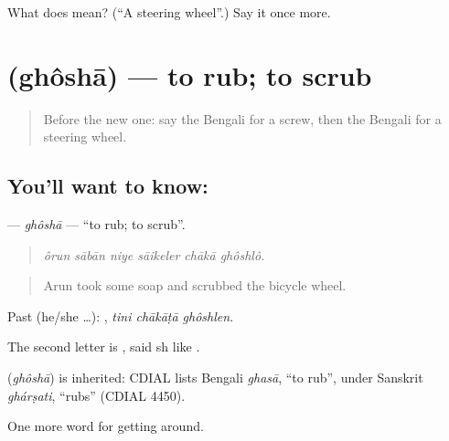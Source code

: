\begin{tcolorbox}[breakable,colback=teal!4,colframe=teal!35!black,title={Before you move on}]
What does  mean? (\textquotedblleft{}A steering wheel\textquotedblright{}.) Say it once more.
\end{tcolorbox}
\section[\texorpdfstring{\bn{ঘষা} (ghôshā)}{ঘষা (ghôshā)}]{ (ghôshā) — to rub; to scrub}

\label{lesson:BN-C394-ghosha}



\begin{quote}
Before the new one: say the Bengali for a screw, then the Bengali for a steering wheel.
\end{quote}

\subsection*{You'll want to know: }
\textbf{} — \emph{ghôshā} — \textquotedblleft{}to rub; to scrub\textquotedblright{}.

\begin{quote}
     
\end{quote}

\begin{quote}
\emph{ôrun sābān niye sāikeler chākā ghôshlô.}
\end{quote}

\begin{quote}
Arun took some soap and scrubbed the bicycle wheel.
\end{quote}

Past (he/she …):   , \emph{tini chākāṭā ghôshlen}.

The second letter is , said sh like .

\begin{cousinweb}
\textbf{} (\emph{ghôshā}) is inherited: CDIAL lists Bengali \emph{ghasā}, \textquotedblleft{}to rub\textquotedblright{}, under Sanskrit \emph{ghárṣati}, \textquotedblleft{}rubs\textquotedblright{} (CDIAL 4450).
\end{cousinweb}

\begin{grammarlens}[title={What you've built}]
One more word for getting around.
\end{grammarlens}

